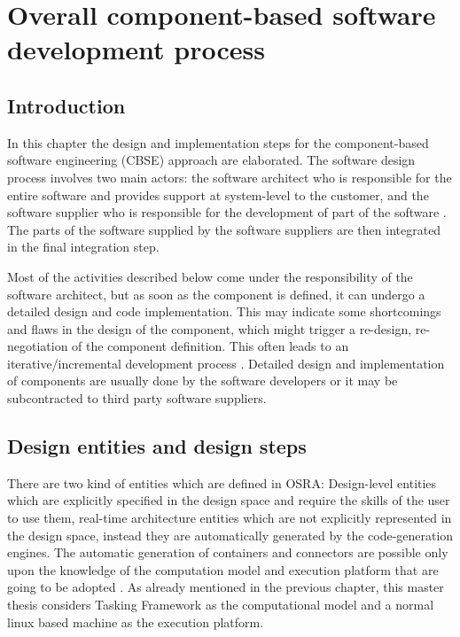 
\chapter{Overall component-based software development process}
\label{chap: Software development process}
\section{Introduction}
In this chapter the design and implementation steps for the component-based software engineering (CBSE) approach are elaborated. The software design process involves two main actors: the software architect who is responsible for the entire software and provides support at system-level to the customer, and the software supplier who is responsible for the development of part of the software \cite{CompBasedProcess}. The parts of the software supplied by the software suppliers are then integrated in the final integration step.

Most of the activities described below come under the responsibility of the software architect, but as soon as the component is defined, it can undergo a detailed design and code implementation. This may indicate some shortcomings and flaws in the design of the component, which might trigger a re-design, re-negotiation of the component definition. This often leads to an iterative/incremental development process \cite{ScheduAnaly}. Detailed design and implementation of components are usually done by the software developers or it may be subcontracted to third party software suppliers. 

\section{Design entities and design steps}
\label{section: Design steps}
There are two kind of entities which are defined in OSRA: Design-level entities which are explicitly specified in the design space and require the skills of the user to use them, real-time architecture entities which are not explicitly represented in the design space, instead they are automatically generated by the code-generation engines. The automatic generation of containers and connectors are possible only upon the knowledge of the computation model and execution platform that are going to be adopted \cite{SAVOIR,CompBasedProcess}. As already mentioned in the previous chapter, this master thesis considers Tasking Framework as the computational model and a normal linux based machine as the execution platform.   

